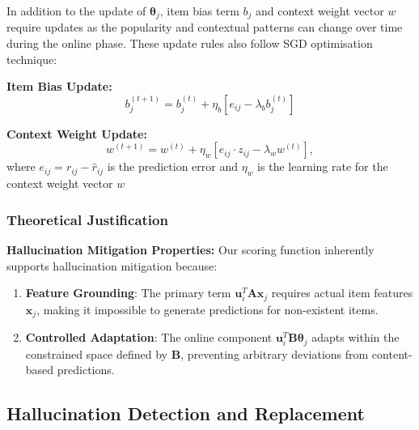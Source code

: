 \documentclass[acmsmall]{acmart}
\begin{document}
In addition to the update of $\boldsymbol{\theta}_j$, item bias term $b_j$ and context weight vector $w$ require updates as the popularity and contextual patterns can change over time during the online phase. These update rules also follow SGD optimisation technique: 


\textbf{Item Bias Update:}
\begin{equation}
b_j^{(t+1)} = b_j^{(t)} + \eta_b \left[e_{ij} - \lambda_b b_j^{(t)}\right]
\end{equation}

\textbf{Context Weight Update:}
\begin{equation}
w^{(t+1)} = w^{(t)} + \eta_w \left[e_{ij} \cdot z_{ij} - \lambda_w w^{(t)}\right],
\end{equation}
where $e_{ij} = r_{ij} - \hat{r}_{ij}$ is the prediction error and $\eta_w$ is the learning rate for the context weight vector $w$
\subsubsection{Theoretical Justification}

\textbf{Hallucination Mitigation Properties:} Our scoring function inherently supports hallucination mitigation because:
\begin{enumerate}
    \item \textbf{Feature Grounding}: The primary term $\mathbf{u}_i^T \mathbf{A} \mathbf{x}_j$ requires actual item features $\mathbf{x}_j$, making it impossible to generate predictions for non-existent items.
    \item \textbf{Controlled Adaptation}: The online component $\mathbf{u}_i^T \mathbf{B} \boldsymbol{\theta}_j$ adapts within the constrained space defined by $\mathbf{B}$, preventing arbitrary deviations from content-based predictions.
\end{enumerate}
\subsection{Hallucination Detection and Replacement}
\label{sec:hallucination_mitigation}
\end{document}
